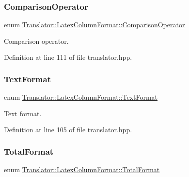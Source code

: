\subsubsection{\texorpdfstring{Comparison\+Operator}{ComparisonOperator}}
{\footnotesize\ttfamily enum \hyperlink{classTranslator_1_1LatexColumnFormat_a9401c4c02f92f224268e919aac9cb15e}{Translator\+::\+Latex\+Column\+Format\+::\+Comparison\+Operator}}



Comparison operator. 



Definition at line 111 of file translator.\+hpp.

\mbox{\label{classTranslator_1_1LatexColumnFormat_a3e57341308ef433ca03cb41faa3e6c00}} 
\subsubsection{\texorpdfstring{Text\+Format}{TextFormat}}
{\footnotesize\ttfamily enum \hyperlink{classTranslator_1_1LatexColumnFormat_a3e57341308ef433ca03cb41faa3e6c00}{Translator\+::\+Latex\+Column\+Format\+::\+Text\+Format}}



Text format. 



Definition at line 105 of file translator.\+hpp.

\mbox{\label{classTranslator_1_1LatexColumnFormat_a0754fb96fce28c9f04a8ef5353eede60}} 
\subsubsection{\texorpdfstring{Total\+Format}{TotalFormat}}
{\footnotesize\ttfamily enum \hyperlink{classTranslator_1_1LatexColumnFormat_a0754fb96fce28c9f04a8ef5353eede60}{Translator\+::\+Latex\+Column\+Format\+::\+Total\+Format}}



